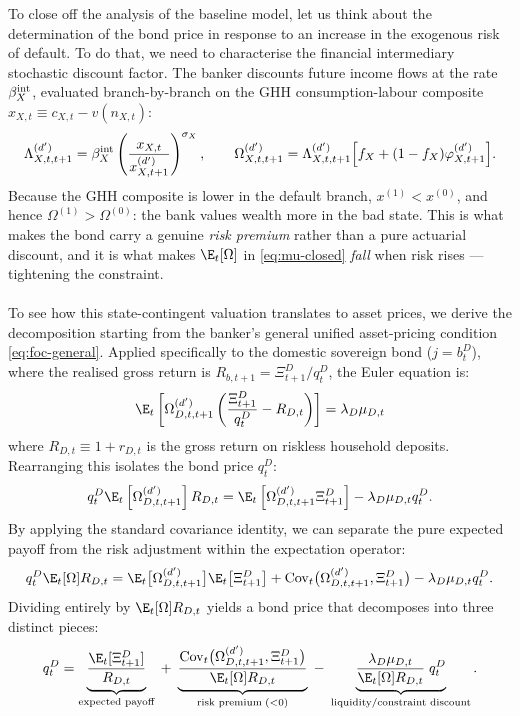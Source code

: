 To close off the analysis of the baseline model, let us think about the determination of the bond price in response to an increase in the exogenous risk of default. To do that, we need to characterise the financial intermediary stochastic discount factor. The banker discounts future income flows at the rate $\beta^{\rm int}_X$, evaluated branch-by-branch on the GHH consumption-labour composite $x_{X,t} \equiv c_{X,t} - v(n_{X,t})$:
\begin{equation}
\Lambda^{(d')}_{X,t,t+1}
=\beta^{\rm int}_X
 \left(\frac{x_{X,t}}{x^{(d')}_{X,t+1}}\right)^{\sigma_X},
\qquad
\Omega^{(d')}_{X,t,t+1}
=\Lambda^{(d')}_{X,t,t+1}\Bigl[f_X+(1-f_X)\varphi^{(d')}_{X,t+1}\Bigr].
\label{eq:branch-sdf}
\end{equation}
Because the GHH composite is lower in the default branch, $x^{(1)}<x^{(0)}$, and hence $\Omega^{(1)}>\Omega^{(0)}$: the bank values wealth more in the bad state. This is what makes the bond carry a genuine \emph{risk premium} rather than a pure actuarial discount, and it is what makes $\E_t[\Omega]$ in \eqref{eq:mu-closed} \emph{fall} when risk rises --- tightening the constraint.\\
\\
To see how this state-contingent valuation translates to asset prices, we derive the decomposition starting from the banker's general unified asset-pricing condition \eqref{eq:foc-general}. Applied specifically to the domestic sovereign bond ($j=b_t^D$), where the realised gross return is $R_{b,t+1} = \Xi^D_{t+1}/q^D_t$, the Euler equation is:
\begin{equation}
\E_t\left[\Omega^{(d')}_{D,t,t+1}\left(\frac{\Xi^D_{t+1}}{q^D_t} - R_{D,t}\right)\right] = \lambda_D\mu_{D,t} 
\label{eq:euler-bond}
\end{equation}
where $R_{D,t} \equiv 1+r_{D,t}$ is the gross return on riskless household deposits. Rearranging this isolates the bond price $q^D_t$:
\begin{equation}
q^D_t \E_t\left[\Omega^{(d')}_{D,t,t+1}\right] R_{D,t} = \E_t\left[\Omega^{(d')}_{D,t,t+1}\Xi^D_{t+1}\right] - \lambda_D\mu_{D,t} q^D_t.
\label{eq:euler-rearranged}
\end{equation}
By applying the standard covariance identity, we can separate the pure expected payoff from the risk adjustment within the expectation operator:
\begin{equation}
q^D_t \E_t[\Omega] R_{D,t} = \E_t\bigl[\Omega^{(d')}_{D,t,t+1}\bigr] \E_t\bigl[\Xi^D_{t+1}\bigr] + \mathrm{Cov}_t\bigl(\Omega^{(d')}_{D,t,t+1}, \Xi^D_{t+1}\bigr) - \lambda_D\mu_{D,t} q^D_t.
\end{equation}
Dividing entirely by $\E_t[\Omega] R_{D,t}$ yields a bond price that decomposes into three distinct pieces:
\begin{equation}
q^D_t
=\underbrace{\frac{\E_t[\Xi^D_{t+1}]}{R_{D,t}}}_{\text{expected payoff}}
\;+\;\underbrace{\frac{\mathrm{Cov}_t\bigl(\Omega^{(d')}_{D,t,t+1},\Xi^D_{t+1}\bigr)}
                       {\E_t[\Omega]R_{D,t}}}_{\text{risk premium}\;(<0)}
\;-\;\underbrace{\frac{\lambda_D\mu_{D,t}}
     {\E_t[\Omega]R_{D,t}}\;q^D_t}_{\text{liquidity/constraint discount}} .
\label{eq:bond-decomposition}
\end{equation}

